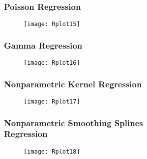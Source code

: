 \documentclass[border=5mm, convert, usenames, dvipsnames,beamer]{standalone}
\begin{document}
\begin{frame}[ fragile]{}
\frametitle{Poisson
 Regression}

\vspace{40}
\noindent

\vspace{0mm}
\begin{figure}[h!]
\begin{center}
\texttt{[image: Rplot15]}
\end{center}
\end{figure}




\end{frame}






\begin{frame}[ fragile]{}
\frametitle{Gamma Regression}

\vspace{40}
\noindent

\vspace{0mm}
\begin{figure}[h!]
\begin{center}
\texttt{[image: Rplot16]}
\end{center}
\end{figure}




\end{frame}





\begin{frame}[ fragile]{}
\frametitle{Nonparametric Kernel Regression}

\vspace{40}
\noindent

\vspace{0mm}
\begin{figure}[h!]
\begin{center}
\texttt{[image: Rplot17]}
\end{center}
\end{figure}




\end{frame}







\begin{frame}[ fragile]{}
\frametitle{Nonparametric Smoothing Splines \\ Regression}

\vspace{40}
\noindent

\vspace{0mm}
\begin{figure}[h!]
\begin{center}
\texttt{[image: Rplot18]}
\end{center}
\end{figure}




\end{frame}
\end{document}
